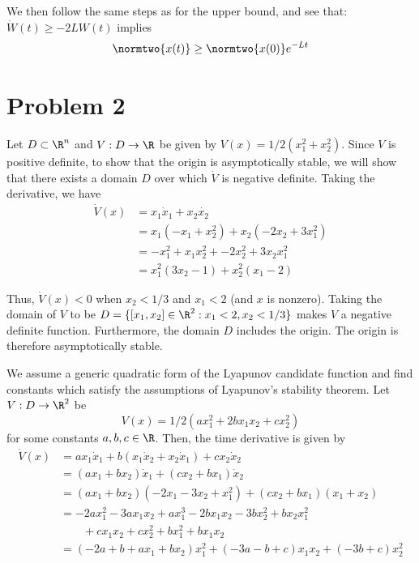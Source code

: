 \documentclass{homework}
\begin{document}
\begin{letterenum}
We then follow the same steps as for the upper bound, and see that:
$\dot{W}(t) \geq -2LW(t)$ implies
\begin{equation*}
    \normtwo{x(t)} \geq \normtwo{x(0)} e^{-Lt}
\end{equation*}
\end{letterenum}

\section{Problem 2}

\begin{letterenum}
\item Let $D\subset \R^n$ and $V: D \to \R$ be given by $V(x) = 1/2(x_1^2 + x_2^2)$.
Since $V$ is positive definite, to show that the origin is asymptotically stable,
we will show that there exists a domain $D$ over which $\dot{V}$ is negative definite.
Taking the derivative, we have
    \begin{align*}
        \dot{V}(x) &= x_1 \dot{x}_1 + x_2 \dot{x_2} \\
            &= x_1(-x_1 + x_2^2) + x_2( -2x_2 + 3x_1^2) \\
            &= -x_1^2 + x_1 x_2^2 + -2x_2^2 + 3x_2x_1^2 \\
            &= x_1^2(3x_2 - 1) + x_2^2(x_1 - 2)
    \end{align*}

Thus, $\dot{V}(x) < 0$ when $x_2 < 1/3$ and $x_1 < 2$ (and $x$ is nonzero).
Taking the domain of $V$ to be $D = \{[x_1, x_2] \in \R^2: x_1 < 2, x_2 < 1/3\}$
makes $V$ a negative definite function. Furthermore, the domain $D$ includes the
origin. The origin is therefore asymptotically stable.

\item We assume a generic quadratic form of the Lyapunov candidate function
 and find constants which satisfy the assumptions of Lyapunov's stability theorem.
 Let $V: D \to \R^2$ be
\begin{equation*}
    V(x) = 1/2(ax_1^2 + 2bx_1 x_2 + cx_2^2)
\end{equation*}
for some constants $a,b,c\in\R$. Then, the time derivative is given by
\begin{align*}
    \dot{V}(x) &= ax_1 \dot{x}_1 + b(x_1 \dot{x}_2 + x_2 \dot{x}_1) + c x_2 \dot{x}_2 \\
        &= (ax_1 + b x_2) \dot{x}_1 + (cx_2 + bx_1) \dot{x}_2 \\
        &= (ax_1 + bx_2)(-2x_1 -3x_2 + x_1^2) + (cx_2 + bx_1)(x_1 + x_2) \\
        &= -2ax_1^2 - 3ax_1 x_2 + ax_1^3 - 2bx_1x_2 - 3bx_2^2 + bx_2 x_1^2 \\
        &\qquad + cx_1x_2 + cx_2^2 + bx_1^2 + bx_1 x_2 \\
        &= (-2a + b + ax_1 + bx_2) x_1^2 + (-3a - b + c) x_1 x_2 + (-3b + c) x_2^2
\end{align*}


\end{letterenum}
\end{document}
